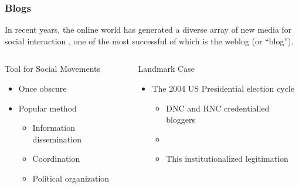 \documentclass{beamer}
\begin{document}

\begin{frame}
\frametitle{Blogs}

\begin{block}{}
 In recent years, the online world has generated a diverse array of new media for social interaction \citep{wellman01}, one of the most successful of which is the weblog (or ``blog'').
\end{block}

\begin{columns}

\begin{block}{Tool for Social Movements}
\begin{itemize}
\item Once obscure
\item Popular method
\begin{itemize}
\item Information dissemination
\item Coordination
\item Political organization
\end{itemize}
\end{itemize}

\end{block}


\begin{block}{Landmark Case}
\begin{itemize}
\item The 2004 US Presidential election cycle
\begin{itemize}
\item DNC and RNC credentialled bloggers 
\item  \cite{butts09b,adamic05,howard05,rainie05}
\item This institutionalized legitimation 
\end{itemize}
\end{itemize}
\end{block}

\end{columns}


\end{frame}


\end{document}
